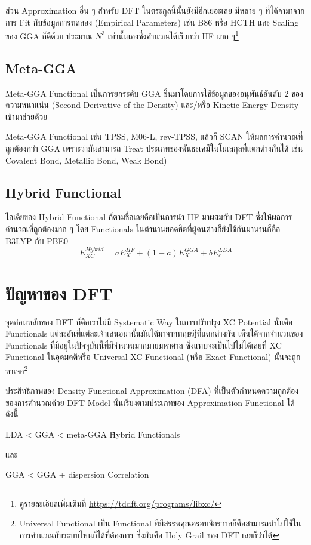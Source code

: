 ส่วน Approximation อื่น ๆ สำหรับ DFT ในตระกูลนี้นั้นยังมีอีกเยอะเลย มีหลาย ๆ ที่ได้จามาจากการ Fit กับข้อมูลการทดลอง (Empirical Parameters) เช่น B86 หรือ HCTH และ Scaling ของ GGA ก็ดีด้วย ประมาณ $N^{3}$ เท่านั้นเองซึ่งคำนวณได้เร็วกว่า HF มาก ๆ\footnote{ดูรายละเอียดเพิ่มเติมที่ \url{https://tddft.org/programs/libxc/}}

\subsection{Meta-GGA}

Meta-GGA Functional เป็นการยกระดับ GGA ขึ้นมาโดยการใช้ข้อมูลของอนุพันธ์อันดับ 2 ของความหนาแน่น (Second Derivative of the Density) และ/หรือ Kinetic Energy Density เข้ามาช่วยด้วย 

Meta-GGA Functional เช่น TPSS, M06-L, rev-TPSS, แล้วก็ SCAN ให้ผลการคำนวณที่ถูกต้องกว่า GGA 
เพราะว่ามันสามารถ Treat ประเภทของพันธะเคมีในโมเลกุลที่แตกต่างกันได้ เช่น Covalent Bond, Metallic Bond, 
Weak Bond) 

\subsection{Hybrid Functional}

ไอเดียของ Hybrid Functional ก็ตามชื่อเลยคือเป็นการนำ HF มาผสมกับ DFT ซึ่งให้ผลการคำนวณที่ถูกต้องมาก ๆ โดย Functionals ในตำนานยอดฮิตที่ผู้คนต่างก็ยังใช้กันมานานก็คือ B3LYP กับ PBE0 
%
\begin{equation}
    E^{Hybrid}_{XC} = a E^{HF}_{X} + (1 - a) E^{GGA}_{X} + b E^{LDA}_{c}
\end{equation}

\section{ปัญหาของ DFT}

จุดอ่อนหลักของ DFT ก็คือเราไม่มี Systematic Way ในการปรับปรุง XC Potential นั่นคือ Functionals แต่ละอันที่แต่ละเจ้าเสนอมานั้นมันได้มาจากทฤษฎีที่แตกต่างกัน เห็นได้จากจำนวนของ Functionals ที่มีอยู่ในปัจจุบันนี้ที่มีจำนวนมากมายมหาศาล ซึ่งแทบจะเป็นไปไม่ได้เลยที่ XC Functional ในอุดมคติหรือ Universal XC Functional (หรือ Exact Functional) นั้นจะถูกหาเจอ\footnote{Universal Functional เป็น Functional ที่มีสรรพคุณครอบจักรวาลก็คือสามารถนำไปใช้ในการคำนวณกับระบบไหนก็ได้ที่ต้องการ ซึ่งมันคือ Holy Grail 
ของ DFT เลยก็ว่าได้}

ประสิทธิภาพของ Density Functional Approximation (DFA) ที่เป็นตัวกำหนดความถูกต้องของการคำนวณด้วย DFT Model นั้นเรียงตามประเภทของ Approximation Functional ได้ดังนี้
%
\begin{framed}
LDA < GGA < meta-GGA \~ Hybrid Functionals 
\end{framed}
%
\noindent และ 
%
\begin{framed}
GGA < GGA + dispersion Correlation 
\end{framed}

